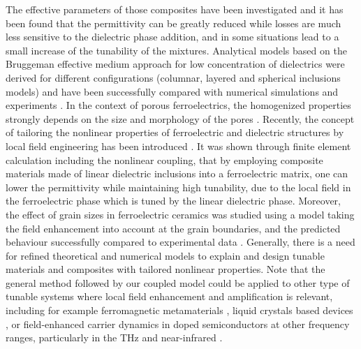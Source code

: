 \documentclass[%
 aip,
 amsmath,amssymb,
 reprint,%
]{revtex4-1}
\newcommand{\co}[1]{#1}
\begin{document}
The effective parameters of those composites have been investigated
\cite{sherman_ferroelectric-dielectric_2006, jylha_tunability_2008, sherman_tunability_2004, astafiev_can_2003}
and it has been found that the permittivity can be greatly reduced while losses are much less
 sensitive to the dielectric phase addition, and in some situations lead to a small
  increase of the tunability of the mixtures. Analytical models based on the Bruggeman effective
medium approach for low concentration of dielectrics were derived for different configurations (columnar, layered and spherical
inclusions models) and have been successfully compared with numerical simulations and experiments \cite{sherman_ferroelectric-dielectric_2006}.
  In the context of porous ferroelectrics,
   the homogenized properties strongly depends on the size and morphology of the pores
    \cite{okazaki_effects_1973,stanculescu_study_2015}.
    Recently, the concept of tailoring the nonlinear properties of ferroelectric
     and dielectric structures by local field engineering has been introduced \cite{padurariu_tailoring_2012,padurariu_field-dependent_2012,cazacu_tunable_2013}.
      It was shown through finite element calculation including the nonlinear coupling, that by employing
      composite materials made of linear dielectric inclusions into a ferroelectric matrix, one can lower the permittivity while maintaining
      high tunability, due to the local field in the ferroelectric phase which is tuned by the linear dielectric phase.
Moreover, the effect of grain sizes in ferroelectric
ceramics was studied using a model taking the field enhancement into account at
the grain boundaries, and the predicted behaviour successfully compared to experimental data \cite{padurariu_field-dependent_2012}.
Generally, there is a need for refined theoretical and numerical models to explain and design
tunable materials and composites with tailored nonlinear properties.
\co{Note that the general method followed by our coupled model could be applied to other type of tunable
systems where local field enhancement and amplification is relevant, including for example ferromagnetic metamaterials \cite{carignan_ferromagnetic_2011}, liquid crystals based devices \cite{werner_liquid_2007}, or field-enhanced carrier dynamics in doped semiconductors at other frequency ranges, particularly in the THz and near-infrared
\cite{keiser_terahertz_2019, fan_nonlinear_2013}.
}
\end{document}
